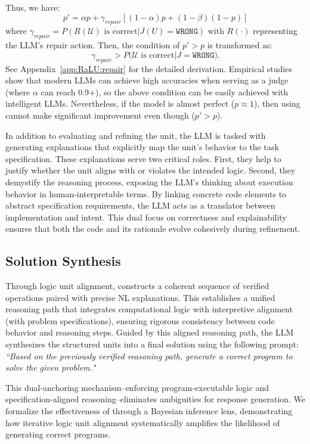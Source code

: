 Thus, we have:
\begin{equation}
p' = \alpha p + \gamma_{repair}[(1-\alpha)p + (1-\beta)(1-p)]
\end{equation}
where $\gamma_{repair} = P(R(\mathcal{U})\text{ is correct} | J(U)=\texttt{WRONG})$ with $R(\cdot)$ representing the LLM's repair action. Then, the condition of $p'> p$ is transformed as:
\begin{equation}
\gamma_{repair} > P(\mathcal{U}\text{ is correct} | J=\texttt{WRONG)}.
\end{equation}
See Appendix~\ref{app:RaLU:repair} for the detailed derivation.
Empirical studies show that modern LLMs can achieve high accuracies when serving as a judge~\cite{JudgeStudy} (where $\alpha$ can reach 0.9+), so the above condition can be easily achieved with intelligent LLMs.
Nevertheless, if the model is almost perfect ($p \approx 1$), then using \tool cannot make significant improvement even though ($p' > p$).

In addition to evaluating and refining the unit, the LLM is tasked with generating explanations that explicitly map the unit’s behavior to the task specification. These explanations serve two critical roles.
First, they help to justify whether the unit aligns with or violates the intended logic.
Second, they demystify the reasoning process, exposing the LLM’s thinking about execution behavior in human-interpretable terms.
By linking concrete code elements to abstract specification requirements, the LLM acts as a translator between implementation and intent. This dual focus on correctness and explainability ensures that both the code and its rationale evolve cohesively during refinement.


\subsection{Solution Synthesis}
Through logic unit alignment, \tool constructs a coherent sequence of verified operations paired with precise NL explanations. This establishes a unified reasoning path that integrates computational logic with interpretive alignment (with problem specifications), ensuring rigorous consistency between code behavior and reasoning steps.
Guided by this aligned reasoning path, the LLM synthesizes the structured units into a final solution using the following prompt: \textit{``Based on the previously verified reasoning path, generate a correct program to solve the given problem."}

This dual-anchoring mechanism--enforcing program-executable logic and specification-aligned reasoning--eliminates ambiguities for response generation. 
We formalize the effectiveness of \tool through a Bayesian inference lens, demonstrating how iterative logic unit alignment systematically amplifies the likelihood of generating correct programs.

